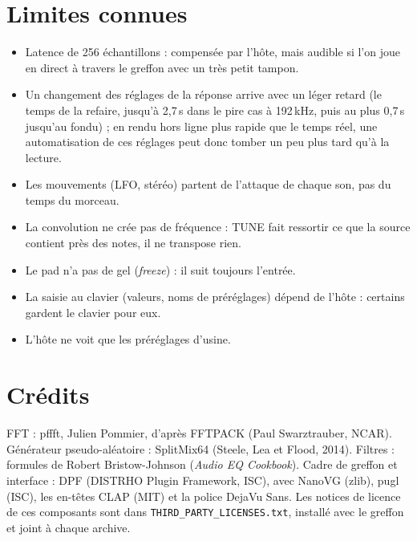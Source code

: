\documentclass[a4paper,11pt]{article}
\begin{document}
\section{Limites connues}\label{sec:limites}
\begin{itemize}
\item Latence de 256 échantillons : compensée par l'hôte, mais audible si l'on joue en direct à
  travers le greffon avec un très petit tampon.
\item Un changement des réglages de la réponse arrive avec un léger retard (le temps de la refaire,
  jusqu'à 2,7\,s dans le pire cas à 192\,kHz, puis au plus 0,7\,s jusqu'au fondu) ; en rendu hors ligne plus rapide que le temps réel,
  une automatisation de ces réglages peut donc tomber un peu plus tard qu'à la lecture.
\item Les mouvements (LFO, stéréo) partent de l'attaque de chaque son, pas du temps du
  morceau.
\item La convolution ne crée pas de fréquence : TUNE fait ressortir ce que la source contient près
  des notes, il ne transpose rien.
\item Le pad n'a pas de gel (\emph{freeze}) : il suit toujours l'entrée.
\item La saisie au clavier (valeurs, noms de préréglages) dépend de l'hôte : certains gardent le
  clavier pour eux.
\item L'hôte ne voit que les préréglages d'usine.
\end{itemize}

\section{Crédits}
FFT : pffft, Julien Pommier, d'après FFTPACK (Paul Swarztrauber, NCAR). Générateur
pseudo-aléatoire : SplitMix64 (Steele, Lea et Flood, 2014). Filtres : formules de Robert
Bristow-Johnson (\emph{Audio EQ Cookbook}). Cadre de greffon et interface : DPF (DISTRHO Plugin
Framework, ISC), avec NanoVG (zlib), pugl (ISC), les en-têtes CLAP (MIT) et la police DejaVu Sans.
Les notices de licence de ces composants sont dans \texttt{THIRD\_PARTY\_LICENSES.txt}, installé
avec le greffon et joint à chaque archive.
\end{document}
